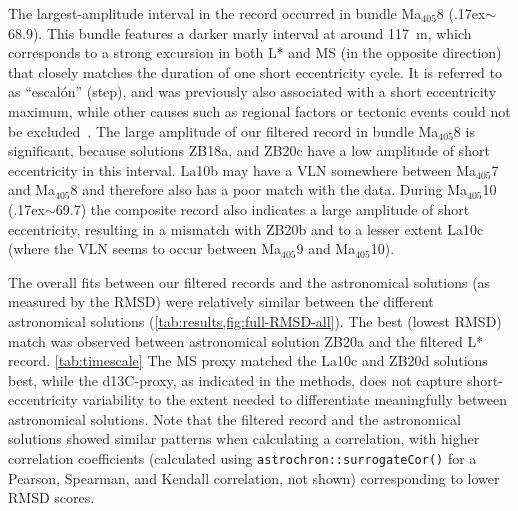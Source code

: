 \documentclass[]{agujournal2019}
\newcommand{\appr}{\raise.17ex\hbox{\(\scriptstyle\sim\)}} %
\newcommand{\ma}[1]{Ma\(_{405}\)#1} %
\begin{document}
The largest-amplitude interval in the record occurred in bundle \ma{8} (\appr\qty{68.9}{\millionyearago}).
This bundle features a darker marly interval at around \qty{117}{\metre}, which corresponds to a strong excursion in both \gls{L*} and \gls{MS} (in the opposite direction) that closely matches the duration of one short eccentricity cycle.
It is referred to as ``escal\'{o}n'' (step), and was previously also associated with a short eccentricity maximum, while other causes such as regional factors or tectonic events could not be excluded~\cite{Dinares-Turell2013}.
The large amplitude of our filtered record in bundle \ma{8} is significant, because solutions ZB18a, and ZB20c have a low amplitude of short eccentricity in this interval.
La10b may have a \gls{VLN} somewhere between \ma{7} and \ma{8} and therefore also has a poor match with the data.
During \ma{10} (\appr\qty{69.7}{\millionyearago}) the composite record also indicates a large amplitude of short eccentricity, resulting in a mismatch with ZB20b and to a lesser extent La10c (where the \gls{VLN} seems to occur between \ma{9} and \ma{10}).

The overall fits between our filtered records and the astronomical solutions (as measured by the \gls{RMSD}) were relatively similar between the different astronomical solutions (\cref{tab:results,fig:full-RMSD-all}).
The best (lowest \gls{RMSD}) match was observed between astronomical solution ZB20a and the filtered \gls{L*} record.
 \cref{tab:timescale}
The \gls{MS} proxy matched the La10c and ZB20d solutions best, while
the \gls{d13C}-proxy, as indicated in the methods, does not capture short-eccentricity variability to the extent needed to differentiate meaningfully between astronomical solutions.
Note that the filtered record and the astronomical solutions showed similar patterns when calculating a correlation, with higher correlation coefficients (calculated using \texttt{astrochron::surrogateCor()} for a Pearson, Spearman, and Kendall correlation, not shown) corresponding to lower \gls{RMSD} scores.
\end{document}
